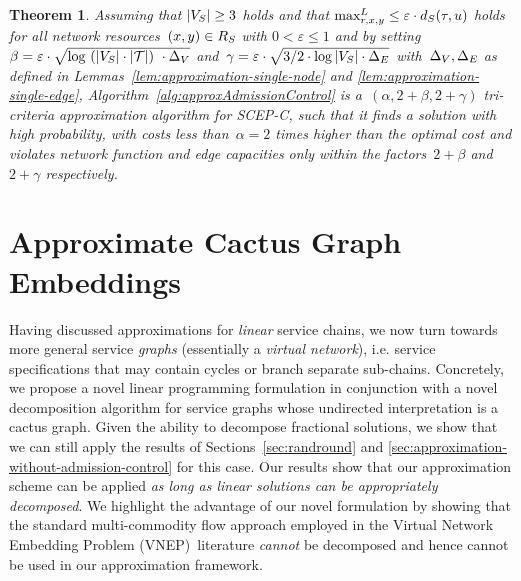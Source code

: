 \documentclass[10pt, conference, letterpaper]{IEEEtran}
\newtheorem{theorem}{Theorem}
\begin{document}
\begin{theorem}
\label{thm:result-for-admission-control-without}
Assuming that $|V_S| \geq 3$ holds and that $\maxLoadV[\req][x][y] \leq \varepsilon \cdot \Scap(\type,u)$ holds for all network resources~$(x,y) \in  R_{S}$ with $0 < \varepsilon \leq 1$ and by setting~$\beta = \varepsilon \cdot \sqrt{\log~(|V_S|\cdot|\mathcal{T}|)~\cdot \Delta_V  }$ and~$\gamma = \varepsilon \cdot \sqrt{3/2\cdot \log |V_S| \cdot \Delta_E  }$ with~$\Delta_V,\Delta_E$ as defined in Lemmas~\ref{lem:approximation-single-node} and \ref{lem:approximation-single-edge}, Algorithm~\ref{alg:approxAdmissionControl} is a~$(\alpha,2+\beta,2+\gamma)$ tri-criteria approximation algorithm for SCEP-C, such that it finds a solution \emph{with high probability}, with costs less than~$\alpha = 2$ times higher than the optimal cost and violates network function and edge capacities only within the factors~$2+\beta$ and~$2+\gamma$ respectively.
\end{theorem}






\section{Approximate Cactus Graph Embeddings}\label{sec:cactus}

Having discussed approximations for \emph{linear} service chains, we now turn towards more general service \emph{graphs} (essentially a \emph{virtual network}), i.e. service specifications that may contain cycles or branch separate sub-chains. 
Concretely, we propose a novel linear programming formulation 
in conjunction with a novel decomposition algorithm for service 
graphs whose undirected interpretation is a cactus graph. 
Given the ability to decompose fractional solutions, 
we show that we can still apply the results of Sections~\ref{sec:randround} and \ref{sec:approximation-without-admission-control} for this case. Our results show that our approximation scheme can be applied \emph{as long as linear solutions can be appropriately decomposed}. We highlight the advantage of our novel formulation by showing that the standard multi-commodity flow approach employed in the Virtual Network Embedding Problem
(VNEP)~literature \emph{cannot} be decomposed and hence cannot be used in our approximation framework.
\end{document}
